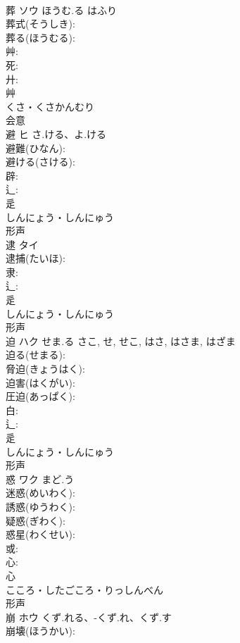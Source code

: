 \documentclass[8pt]{extreport}
\begin{document}
\begin{CJK}{UTF8}{min}
\\	葬	ソウ	ほうむ.る	はふり	
\\	葬式(そうしき): 
\\	葬る(ほうむる): 
\\	艸: 
\\	死: 
\\	廾: 
\\	艸	
\\	くさ・くさかんむり	
\\	会意 
\\	避	ヒ	さ.ける、よ.ける		
\\	避難(ひなん): 
\\	避ける(さける): 
\\	辟: 
\\	辶: 
\\	辵	
\\	しんにょう・しんにゅう	
\\	形声 
\\	逮	タイ			
\\	逮捕(たいほ): 
\\	隶: 
\\	辶: 
\\	辵	
\\	しんにょう・しんにゅう	
\\	形声 
\\	迫	ハク	せま.る	さこ, せ, せこ, はさ, はさま, はざま	
\\	迫る(せまる): 
\\	脅迫(きょうはく): 
\\	迫害(はくがい): 
\\	圧迫(あっぱく): 
\\	白: 
\\	辶: 
\\	辵	
\\	しんにょう・しんにゅう	
\\	形声 
\\	惑	ワク	まど.う		
\\	迷惑(めいわく): 
\\	誘惑(ゆうわく): 
\\	疑惑(ぎわく): 
\\	惑星(わくせい): 
\\	或: 
\\	心: 
\\	心	
\\	こころ・したごころ・りっしんべん	
\\	形声 
\\	崩	ホウ	くず.れる、-くず.れ、くず.す		
\\	崩壊(ほうかい): 

\end{CJK}
\end{document}
